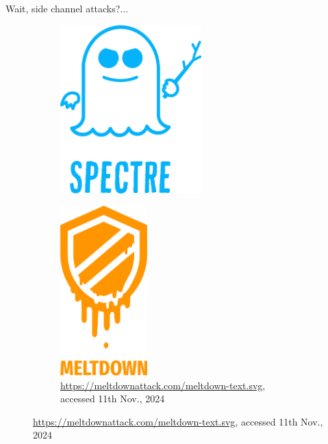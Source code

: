 \documentclass[aspectratio=169]{beamer}
\begin{document}
\begin{frame}{Wait, side channel attacks?...}
    \begin{figure}
        \begin{subfigure}[]{0.45\textwidth}
            \begin{center}
                \includegraphics[width=0.6\textwidth]{images/spectre.pdf}
            \end{center}
        \end{subfigure}
        \begin{subfigure}[]{0.45\textwidth}
            \begin{center}
                \includegraphics[width=0.37\textwidth]{images/meltdown.pdf}
            \end{center}
            \caption{\footnotesize{\url{https://meltdownattack.com/meltdown-text.svg}, accessed 11th Nov., 2024}}
        \end{subfigure}
    \end{figure}
\end{frame}
\end{document}

